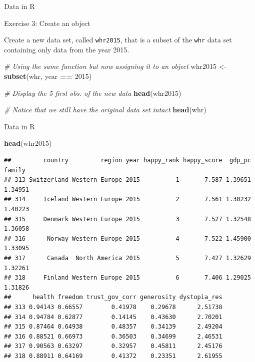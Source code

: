 \documentclass[ignorenonframetext,]{beamer}
\newenvironment{Shaded}{\begin{snugshade}}{\end{snugshade}}
\newcommand{\KeywordTok}[1]{\textcolor[rgb]{0.13,0.29,0.53}{\textbf{#1}}}
\newcommand{\DecValTok}[1]{\textcolor[rgb]{0.00,0.00,0.81}{#1}}
\newcommand{\StringTok}[1]{\textcolor[rgb]{0.31,0.60,0.02}{#1}}
\newcommand{\CommentTok}[1]{\textcolor[rgb]{0.56,0.35,0.01}{\textit{#1}}}
\newcommand{\OperatorTok}[1]{\textcolor[rgb]{0.81,0.36,0.00}{\textbf{#1}}}
\newcommand{\NormalTok}[1]{#1}
\begin{document}
\begin{frame}[fragile]{Data in R}

\begin{block}{Exercise 3: Create an object}

Create a new data set, called \texttt{whr2015}, that is a subset of the
\texttt{whr} data set containing only data from the year 2015.

\begin{Shaded}
\begin{Highlighting}[]
\CommentTok{# Using the same function but now assigning it to an object}
\NormalTok{whr2015 <-}\StringTok{ }\KeywordTok{subset}\NormalTok{(whr, year }\OperatorTok{==}\StringTok{ }\DecValTok{2015}\NormalTok{)}

\CommentTok{# Display the 5 first obs. of the new data}
\KeywordTok{head}\NormalTok{(whr2015)}

\CommentTok{# Notice that we still have the original data set intact}
\KeywordTok{head}\NormalTok{(whr)}
\end{Highlighting}
\end{Shaded}

\end{block}

\end{frame}

\begin{frame}[fragile]{Data in R}

\scriptsize

\begin{Shaded}
\begin{Highlighting}[]
\KeywordTok{head}\NormalTok{(whr2015)}
\end{Highlighting}
\end{Shaded}

\begin{verbatim}
##         country         region year happy_rank happy_score  gdp_pc  family
## 313 Switzerland Western Europe 2015          1       7.587 1.39651 1.34951
## 314     Iceland Western Europe 2015          2       7.561 1.30232 1.40223
## 315     Denmark Western Europe 2015          3       7.527 1.32548 1.36058
## 316      Norway Western Europe 2015          4       7.522 1.45900 1.33095
## 317      Canada  North America 2015          5       7.427 1.32629 1.32261
## 318     Finland Western Europe 2015          6       7.406 1.29025 1.31826
##      health freedom trust_gov_corr generosity dystopia_res
## 313 0.94143 0.66557        0.41978    0.29678      2.51738
## 314 0.94784 0.62877        0.14145    0.43630      2.70201
## 315 0.87464 0.64938        0.48357    0.34139      2.49204
## 316 0.88521 0.66973        0.36503    0.34699      2.46531
## 317 0.90563 0.63297        0.32957    0.45811      2.45176
## 318 0.88911 0.64169        0.41372    0.23351      2.61955
\end{verbatim}

\end{frame}
\end{document}
